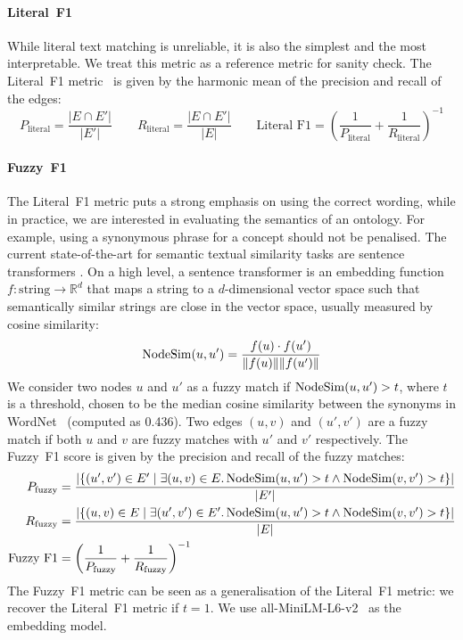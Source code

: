 \paragraph{Literal~F1}
While literal text matching is unreliable, it is also the simplest and the most interpretable. We treat this metric as a reference metric for sanity check. The Literal~F1 metric~\cite{Kashyap2005TaxaMinerAE} is given by the harmonic mean of the precision and recall of the edges:
\[
    P_{\text{literal}} = \frac{|E \cap E'|}{|E'|} \qquad
    R_{\text{literal}} = \frac{|E \cap E'|}{|E|} \qquad
    \text{Literal~F1} = \left(\frac{1}{P_{\text{literal}}} + \frac{1}{R_{\text{literal}}}\right)^{-1}
\]

\paragraph{Fuzzy~F1}
The Literal~F1 metric puts a strong emphasis on using the correct wording, while in practice, we are interested in evaluating the semantics of an ontology. For example, using a synonymous phrase for a concept should not be penalised. The current state-of-the-art for semantic textual similarity tasks are sentence transformers \cite{reimers-2019-sentence-bert,jiang2022improved,jiang2019smart}. On a high level, a sentence transformer is an embedding function $f: \text{string} \to \mathbb{R}^d$ that maps a string to a $d$-dimensional vector space such that semantically similar strings are close in the vector space, usually measured by cosine similarity:
\[
    \operatorname{NodeSim}(u, u') = \frac{f(u) \cdot f(u')}{\|f(u)\| \|f(u')\|}
\]
We consider two nodes $u$ and $u'$ as a fuzzy match if $\operatorname{NodeSim}(u, u') > t$, where $t$ is a threshold, chosen to be the median cosine similarity between the synonyms in WordNet~\cite{miller1995wordnet} (computed as 0.436). Two edges $(u, v)$ and $(u', v')$ are a fuzzy match if both $u$ and $v$ are fuzzy matches with $u'$ and $v'$ respectively. The Fuzzy~F1 score is given by the precision and recall of the fuzzy matches:
\begin{equation*}
    \begin{aligned}
        P_{\text{fuzzy}} & = \frac{|
            \{(u', v') \in E' \mid \exists (u, v) \in E.
            \operatorname{NodeSim}(u, u') > t \land \operatorname{NodeSim}(v, v') > t
            \}
        |}{|E'|}                                                                                       \\
        R_{\text{fuzzy}} & = \frac{|
            \{(u, v) \in E \mid \exists (u', v') \in E'.
            \operatorname{NodeSim}(u, u') > t \land \operatorname{NodeSim}(v, v') > t
            \}
        |}{|E|}                                                                                        \\
        \text{Fuzzy~F1}  & = \left(\frac{1}{P_{\text{fuzzy}}} + \frac{1}{R_{\text{fuzzy}}}\right)^{-1}
    \end{aligned}
\end{equation*}
The Fuzzy~F1 metric can be seen as a generalisation of the Literal~F1 metric: we recover the Literal~F1 metric if $t = 1$. We use all-MiniLM-L6-v2~\cite{wang2020minilm,reimers-2019-sentence-bert} as the embedding model.

